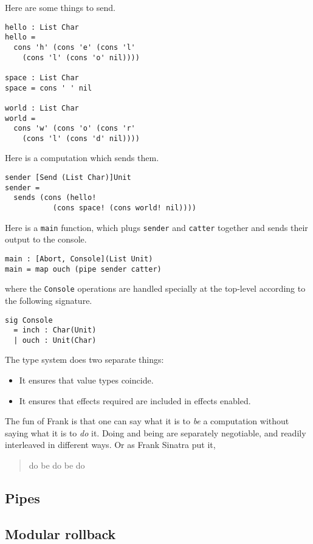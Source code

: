 \documentclass[preprint]{sigplanconf}
\begin{document}
Here are some things to send.
\begin{verbatim}
hello : List Char
hello =
  cons 'h' (cons 'e' (cons 'l'
    (cons 'l' (cons 'o' nil))))

space : List Char
space = cons ' ' nil

world : List Char
world =
  cons 'w' (cons 'o' (cons 'r'
    (cons 'l' (cons 'd' nil))))
\end{verbatim}
%
Here is a computation which sends them.
%
\begin{verbatim}
sender [Send (List Char)]Unit
sender =
  sends (cons (hello!
           (cons space! (cons world! nil))))
\end{verbatim}

Here is a \verb!main! function, which plugs \verb!sender! and
\verb!catter!  together and sends their output to the console.
%
\begin{verbatim}
main : [Abort, Console](List Unit)
main = map ouch (pipe sender catter)
\end{verbatim}
where the \verb!Console! operations are handled specially at the
top-level according to the following signature.
\begin{verbatim}
sig Console
  = inch : Char(Unit)
  | ouch : Unit(Char)
\end{verbatim}

The type system does two separate things:
\begin{itemize}
\item It ensures that value types coincide.
\item It ensures that effects required are included in effects
  enabled.
\end{itemize}

The fun of Frank is that one can say what it is to \emph{be} a
computation without saying what it is to \emph{do} it. Doing and being
are separately negotiable, and readily interleaved in different
ways. Or as Frank Sinatra put it,
\begin{quote}
do be do be do
\end{quote}

\subsection{Pipes}

\subsection{Modular rollback}
\end{document}
